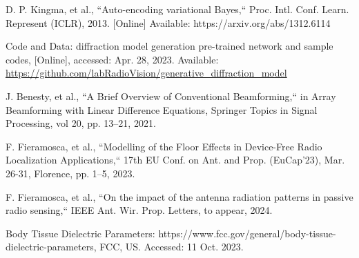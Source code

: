 \begin{thebibliography}{10}
 D. P. Kingma, et al., ``Auto-encoding variational Bayes,`` Proc. Intl. Conf. Learn. Represent (ICLR), 2013. {[}Online{]} Available: https://arxiv.org/abs/1312.6114

Code and Data: diffraction model generation pre-trained network and sample codes, {[}Online{]}, accessed: Apr. 28, 2023. Available: \url{https://github.com/labRadioVision/generative_diffraction_model}

 J. Benesty, et al., ``A Brief Overview of Conventional Beamforming,`` in Array Beamforming with Linear Difference Equations, Springer Topics in Signal Processing, vol 20, pp. 13--21, 2021.

F. Fieramosca, et al., ``Modelling of the Floor Effects in Device-Free Radio Localization Applications,`` 17th EU Conf. on Ant. and Prop. (EuCap'23), Mar. 26-31, Florence, pp. 1--5, 2023.

F. Fieramosca, et al., ``On the impact of the antenna radiation patterns in passive radio sensing,`` IEEE Ant. Wir. Prop. Letters, to appear, 2024.

 Body Tissue Dielectric Parameters: https://www.fcc.gov/general/body-tissue-dielectric-parameters, FCC, US. Accessed: 11 Oct. 2023.

\end{thebibliography}


